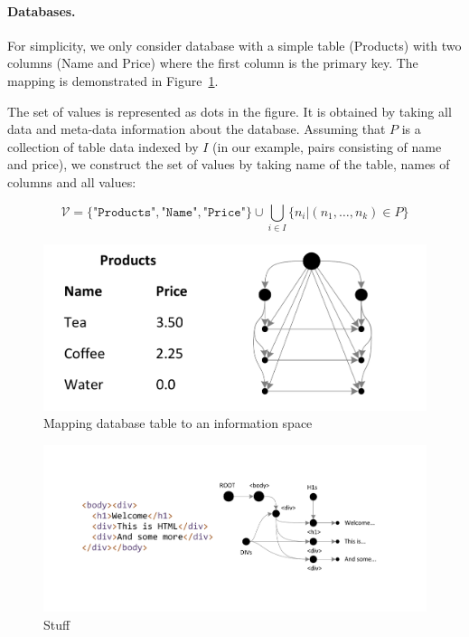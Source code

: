 \documentclass[10pt,a4paper]{article}
\newcommand{\val}[1]{\texttt{#1}}
\newcommand{\calv}{\mathcal{V}}
\begin{document}
\paragraph{Databases.} For simplicity, we only consider database with a simple table 
(Products) with two columns (Name and Price) where the first column is the primary key.
The mapping is demonstrated in Figure~\ref{fig:infospace-db}.

The set of values is represented as dots in the figure. It is obtained by taking all 
data and meta-data information about the database. Assuming that $P$ is a collection of
table data indexed by $I$ (in our example, pairs consisting of name and price), we 
construct the set of values by taking name of the table, names of columns and all values:

\[
\calv = \{ \val{"Products"}, \val{"Name"}, \val{"Price"} \} \cup \bigcup_{i\in I}  \{n_i | (n_1, \ldots, n_k) \in P \}
\]

\begin{figure}
\begin{center}
\includegraphics[scale=0.4]{figs/database.pdf}
\end{center}
\vspace{-1.5em}
\caption{Mapping database table to an information space}
\label{fig:infospace-db}
\end{figure}

\begin{figure}
\begin{center}
\includegraphics[scale=0.4]{figs/xml.pdf}
\end{center}
\vspace{-1.5em}
\caption{Stuff}
\label{fig:stuff2}
\end{figure}
\end{document}
